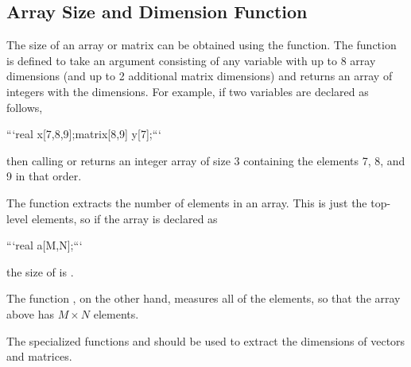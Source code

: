 \begin{description}
{\section{Array Size and Dimension Function}


The size of an array or matrix can be obtained using the  function.  The  function is defined to take an argument consisting of any variable with up to 8 array dimensions (and up to 2 additional matrix dimensions) and returns an array of integers with the dimensions.  For example, if two variables are declared as follows,


```\n real x[7,8,9];\n matrix[8,9] y[7];\n ```


then calling  or  returns an integer array of size 3 containing the elements 7, 8, and 9 in that order.


The  function extracts the number of elements in an array.  This is just the top-level elements, so if the array is declared as


```\n real a[M,N];\n ```


the size of  is .


The function , on the other hand, measures all of the elements, so that the array  above has $M \times N$ elements.


The specialized functions  and  should be used to extract the dimensions of vectors and matrices.


\begin{description}    \end{description}


}
\end{description}
